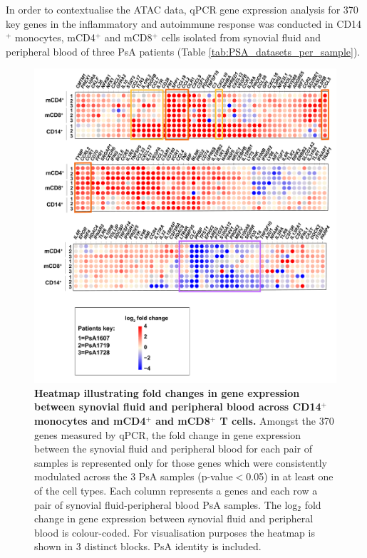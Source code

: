 In order to contextualise the ATAC data, qPCR gene expression analysis for 370 key genes in the inflammatory and autoimmune response was conducted in CD14$^+$ monocytes, mCD4$^+$ and mCD8$^+$ cells isolated from synovial fluid and peripheral blood of three PsA patients (Table \ref{tab:PSA_datasets_per_sample}). %


\begin{figure}[htbp]
\centering
\includegraphics[width=\textwidth]{./Results3/pdfs/PCR_array_PSA_SF_vs_PB_filtered_5_percent_genes_heatmap_final}
\caption[Heatmap illustrating fold changes in gene expression between synovial fluid and peripheral blood across CD14$^+$ monocytes and mCD4$^+$ and mCD8$^+$ T cells.]{\textbf{Heatmap illustrating fold changes in gene expression between synovial fluid and peripheral blood across CD14$^+$ monocytes and mCD4$^+$ and mCD8$^+$ T cells.} Amongst the 370 genes measured by qPCR, the fold change in gene expression between the synovial fluid and peripheral blood for each pair of samples is represented only for those genes which were consistently modulated across the 3 PsA samples (p-value$<$0.05) in at least one of the cell types. Each column represents a genes and each row a pair of synovial fluid-peripheral blood PsA samples. The log$_{2}$ fold change in gene expression between synovial fluid and peripheral blood is colour-coded. For visualisation purposes the heatmap is shown in 3 distinct blocks. PsA identity is included.}
\label{figure:PSA_PCR_array_5_pcnt_heatmap}
\end{figure}

